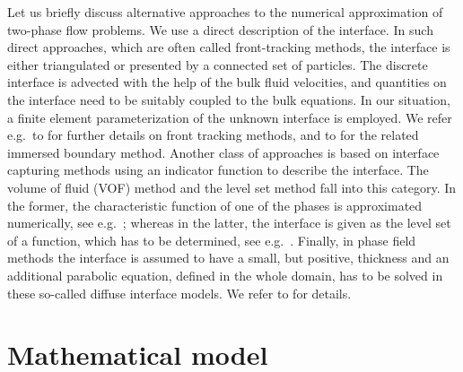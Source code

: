 \documentclass[a4paper,11pt,onecolumn]{article}
\begin{document}
Let us briefly discuss alternative approaches to the numerical approximation of
two-phase flow problems. We use a direct description of the
interface.  In such direct
approaches, which are often called front-tracking methods, the interface is
either triangulated or presented by a connected set of particles. The discrete
interface is advected with the help of the bulk fluid velocities, and
quantities on the interface need to be suitably coupled to the bulk equations.
In our situation, a finite element parameterization of the unknown interface
is employed.
We refer e.g.\ to
\cite{UnverdiT92,Bansch01,Tryggvason_etal01,GanesanMT07,GanesanT08,spurious}
for further details on front tracking methods,
and to \cite{LevequeL97,Peskin02} for the related immersed
boundary method. Another class of approaches is based on interface capturing
methods using an indicator function to describe the interface. The volume of
fluid (VOF) method and the level set method fall into this category. In the
former, the characteristic function of one of the phases is approximated
numerically, see e.g.\ \cite{HirtN81,RenardyR02,Popinet09}; whereas in the
latter, the interface is given as the level set of a function, which has to be
determined, see e.g.\ \cite{SussmanSO94,Sethian99,OsherF03,GrossR07}.
Finally, in phase
field methods the interface is assumed to have a small, but positive, thickness
and an additional parabolic equation, defined in the whole domain, has to be
solved in these so-called diffuse interface models. We refer to
\cite{HohenbergH77,AndersonMW98,LowengrubT98,Feng06,KaySW08,AbelsGG12,GrunK14}
for details.

\section{Mathematical model} \label{sec:2}
\end{document}
